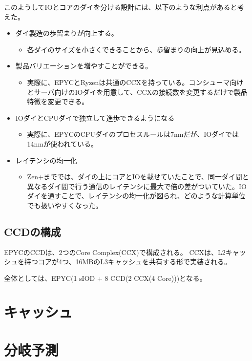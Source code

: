 \documentclass[a4paper,10pt]{jsarticle}
\begin{document}
このようしてIOとコアのダイを分ける設計には、以下のような利点があると考えた。
\begin{itemize}
  \item ダイ製造の歩留まりが向上する。
        \begin{itemize}
          \item 各ダイのサイズを小さくできることから、歩留まりの向上が見込める。
        \end{itemize}
  \item 製品バリエーションを増やすことができる。
        \begin{itemize}
          \item 実際に、EPYCとRyzenは共通のCCXを持っている。コンシューマ向けとサーバ向けのIOダイを用意して、CCXの接続数を変更するだけで製品特徴を変更できる。
        \end{itemize}
  \item IOダイとCPUダイで独立して進歩できるようになる
        \begin{itemize}
          \item 実際に、EPYCのCPUダイのプロセスルールは7nmだが、IOダイでは14nmが使われている。
        \end{itemize}
  \item レイテンシの均一化
        \begin{itemize}
          \item Zen+まででは、ダイの上にコアとIOを載せていたことで、同一ダイ間と異なるダイ間で行う通信のレイテンシに最大で倍の差がついていた。IOダイを通すことで、レイテンシの均一化が図られ、どのような計算単位でも扱いやすくなった。
        \end{itemize}
\end{itemize}

\subsection{CCDの構成}
EPYCのCCDは、2つのCore Complex(CCX)で構成される。
CCXは、L2キャッシュを持つコアが4つ、16MBのL3キャッシュを共有する形で実装される。

全体としては、EPYC(1 sIOD + 8 CCD(2 CCX(4 Core)))となる。

\section{キャッシュ}

\section{分岐予測}
\end{document}
